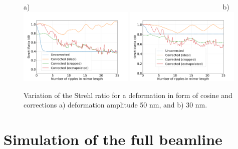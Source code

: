 \documentclass{iucr}
\begin{document}
  \begin{figure}
  \label{fig:strehlRatioCosine} 
  \begin{flushleft}
  a)~~~~~~~~~~~~~~~~~~~~~~~~~~~~~~~~~~~~~~~~~~~~~~~~~~~~~~~b)\\
  \includegraphics[width=0.49\textwidth]{figures/scan_peak_vs_cos50.pdf}
  \includegraphics[width=0.49\textwidth]{figures/scan_peak_vs_cos30.pdf}
  \end{flushleft}
  \caption{Variation of the Strehl ratio for a deformation in form of cosine and corrections a) deformation amplitude 50 nm, and b) 30 nm.}
  \end{figure} 

%
%
%
\section{Simulation of the full beamline}
\label{sec:2D}
\end{document}
